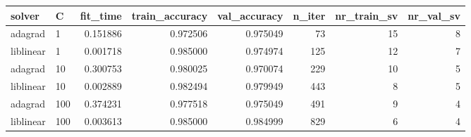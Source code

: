 \begin{tabular}{llrrrrrr}
\toprule
   solver &   C &  fit\_time &  train\_accuracy &  val\_accuracy &  n\_iter &  nr\_train\_sv &  nr\_val\_sv \\
\midrule
  adagrad &   1 &  0.151886 &        0.972506 &      0.975049 &      73 &           15 &          8 \\
liblinear &   1 &  0.001718 &        0.985000 &      0.974974 &     125 &           12 &          7 \\
  adagrad &  10 &  0.300753 &        0.980025 &      0.970074 &     229 &           10 &          5 \\
liblinear &  10 &  0.002889 &        0.982494 &      0.979949 &     443 &            8 &          5 \\
  adagrad & 100 &  0.374231 &        0.977518 &      0.975049 &     491 &            9 &          4 \\
liblinear & 100 &  0.003613 &        0.985000 &      0.984999 &     829 &            6 &          4 \\
\bottomrule
\end{tabular}
